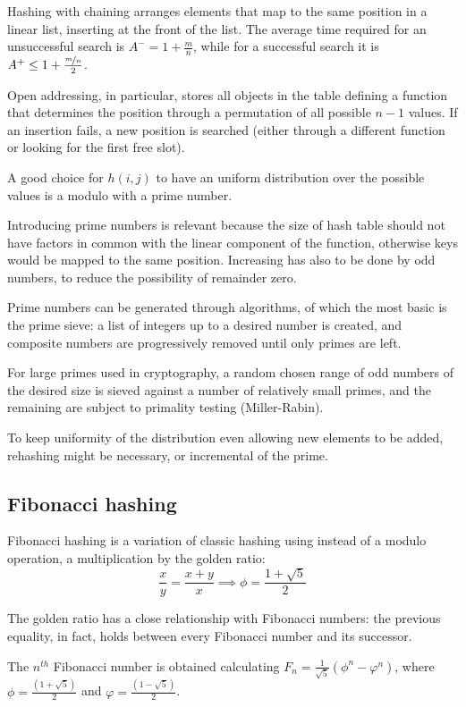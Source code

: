 Hashing with chaining arranges elements that map to the same position in a linear list, inserting at the front of the list. The average time required for an unsuccessful search is $A^- = 1 + \frac{m}{n}$, while for a successful search it is $A^+ \leq 1 + \frac{\nicefrac{m}{n}}{2}$.

Open addressing, in particular, stores all objects in the table defining a function that determines the position through a permutation of all possible $n - 1$ values. If an insertion fails, a new position is searched (either through a different function or looking for the first free slot).

A good choice for $h(i, j)$ to have an uniform distribution over the possible values is a modulo with a prime number.

Introducing prime numbers is relevant because the size of hash table should not have factors in common with the linear component of the function, otherwise keys would be mapped to the same position. Increasing has also to be done by odd numbers, to reduce the possibility of remainder zero.

Prime numbers can be generated through algorithms, of which the most basic is the prime sieve: a list of integers up to a desired number is created, and composite numbers are progressively removed until only primes are left. 

For large primes used in cryptography, a random chosen range of odd numbers of the desired size is sieved against a number of relatively small primes, and the remaining are subject to primality testing (Miller-Rabin).

To keep uniformity of the distribution even allowing new elements to be added, rehashing might be necessary, or incremental of the prime.

\subsection{Fibonacci hashing}
Fibonacci hashing is a variation of classic hashing using instead of a modulo operation, a multiplication by the golden ratio:
$$\frac{x}{y} = \frac{x + y}{x} \implies \phi = \frac{1 + \sqrt{5}}{2}$$

The golden ratio has a close relationship with Fibonacci numbers: the previous equality, in fact, holds between every Fibonacci number and its successor.

The $n^{th}$ Fibonacci number is obtained calculating $F_n = \frac{1}{\sqrt{5}}(\phi^n - \varphi^n)$, where $\phi = \frac{(1 + \sqrt{5})}{2}$ and $\varphi = \frac{(1 - \sqrt{5})}{2}$.

